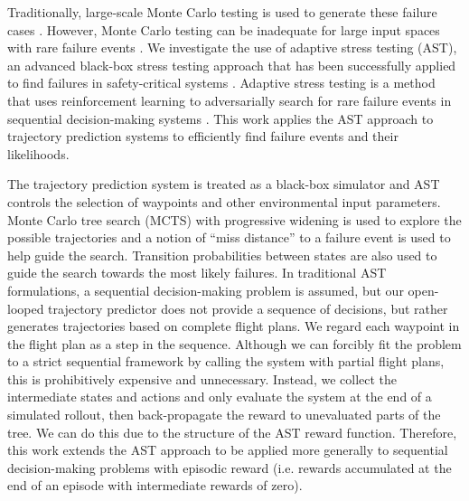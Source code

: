 Traditionally, large-scale Monte Carlo testing is used to generate these failure cases \cite{monte_carlo}. However, Monte Carlo testing can be inadequate for large input spaces with rare failure events \cite{mc_limitations}.
We investigate the use of adaptive stress testing (AST), an advanced black-box stress testing approach that has been successfully applied to find failures in safety-critical systems \cite{ast_acasx,ast_av,lee2018differential,ast_safety}. Adaptive stress testing is a method that uses reinforcement learning to adversarially search for rare failure events in sequential decision-making systems \cite{lee_thesis}. This work applies the AST approach to trajectory prediction systems to efficiently find failure events and their likelihoods.

The trajectory prediction system is treated as a black-box simulator and AST controls the selection of waypoints and other environmental input parameters.
Monte Carlo tree search (MCTS) with progressive widening is used to explore the possible trajectories and a notion of ``miss distance'' to a failure event is used to help guide the search.
Transition probabilities between states are also used to guide the search towards the most likely failures.
% 
In traditional AST formulations, a sequential decision-making problem is assumed, but our open-looped trajectory predictor does not provide a sequence of decisions, but rather generates trajectories based on complete flight plans.
We regard each waypoint in the flight plan as a step in the sequence.
Although we can forcibly fit the problem to a strict sequential framework by calling the system with partial flight plans, this is prohibitively expensive and unnecessary.
Instead, we collect the intermediate states and actions and only evaluate the system at the end of a simulated rollout, then back-propagate the reward to unevaluated parts of the tree.
We can do this due to the structure of the AST reward function.
Therefore, this work extends the AST approach to be applied more generally to sequential decision-making problems with episodic reward (i.e. rewards accumulated at the end of an episode with intermediate rewards of zero).



